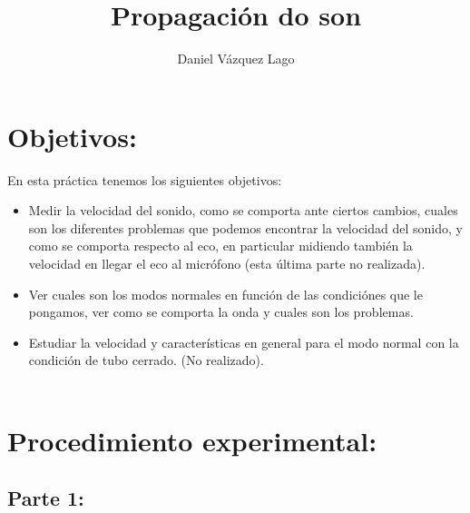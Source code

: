 \documentclass[12pt,a4paper]{article}
\author{Daniel Vázquez Lago}
\title{Propagación do son}
\begin{document}
\maketitle

\newpage

\tableofcontents

\newpage

\section{Objetivos:}
En esta práctica tenemos los siguientes objetivos:
\begin{itemize}
\item Medir la velocidad del sonido, como se comporta ante ciertos cambios, cuales son los diferentes problemas que podemos encontrar la velocidad del sonido, y como se comporta respecto al eco, en particular midiendo también la velocidad en llegar el eco al micrófono (esta última parte no realizada).  

\item Ver cuales son los modos normales en función de las condiciónes que le pongamos, ver como se comporta la onda y cuales son los problemas. 

\item Estudiar la velocidad y características en general para el modo normal con la condición de tubo cerrado. (No realizado). \\
\\
\end{itemize}

\section{Procedimiento experimental:}

\subsection{Parte 1:}
\end{document}
